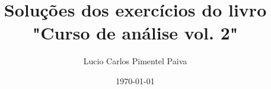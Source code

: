 \documentclass[12pt,a4paper]{article}
\begin{document}
\title{Soluções dos exercícios do livro "Curso de análise vol. 2"}
\author{Lucio Carlos Pimentel Paiva}
\date{\today}

\maketitle

\newpage














\end{document}
